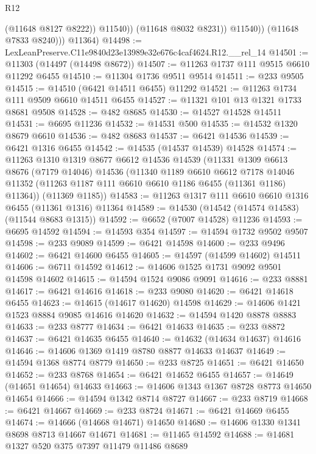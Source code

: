 \begin{lexlean}{R12}
\begin{coremodule}
                      (@11648 @8127 @8222))
                    @11540))
                (@11648 @8032 @8231))
              @11540))
          (@11648 @7833 @8240)))
      @11364)
@14498 := LexLeanPreserve.C11e9840d23e13989e32e676c4caf4624.R12.__rel_14
@14501 := @11303 (@14497 (@14498 @8672))
@14507 := @11263 @1737 @111 @9515 @6610 @11292 @6455
@14510 := @11304 @1736 @9511 @9514
@14511 := @233 @9505
@14515 := @14510 (@6421 @14511 @6455) @11292
@14521 := @11263 @1734 @111 @9509 @6610 @14511 @6455
@14527 := @11321 @101 @13 @1321 @1733 @8681 @9508
@14528 := @482 @8685
@14530 := @14527 @14528 @14511
@14531 := @6695 @11236
@14532 := @14531 @500
@14535 := @14532 @1320 @8679 @6610
@14536 := @482 @8683
@14537 := @6421 @14536
@14539 := @6421 @1316 @6455
@14542 := @14535 (@14537 @14539) @14528
@14574 := @11263
    @1310
    @1319
    @8677
    @6612
    @14536
    @14539
    (@11331
      @1309
      @6613
      @8676
      (@7179 @14046)
      @14536
      (@11340
        @1189
        @6610
        @6612
        @7178
        @14046
        @11352
        (@11263 @1187 @111 @6610 @6610 @1186 @6455 (@11361 @1186) @11364))
      (@11369 @1185))
@14583 := @11263 @1317 @111 @6610 @6610 @1316 @6455 (@11361 @1316) @11364
@14589 := @14530 (@14542 (@14574 @14583) (@11544 @8683 @1315))
@14592 := @6652 (@7007 @14528) @11236
@14593 := @6695 @14592
@14594 := @14593 @354
@14597 := @14594 @1732 @9502 @9507
@14598 := @233 @9089
@14599 := @6421 @14598
@14600 := @233 @9496
@14602 := @6421 @14600 @6455
@14605 := @14597 (@14599 @14602) @14511
@14606 := @6711 @14592
@14612 := @14606 @1525 @1731 @9092 @9501 @14598 @14602
@14615 := @14594 @1524 @9086 @9091
@14616 := @233 @8881
@14617 := @6421 @14616
@14618 := @233 @9080
@14620 := @6421 @14618 @6455
@14623 := @14615 (@14617 @14620) @14598
@14629 := @14606 @1421 @1523 @8884 @9085 @14616 @14620
@14632 := @14594 @1420 @8878 @8883
@14633 := @233 @8777
@14634 := @6421 @14633
@14635 := @233 @8872
@14637 := @6421 @14635 @6455
@14640 := @14632 (@14634 @14637) @14616
@14646 := @14606 @1369 @1419 @8780 @8877 @14633 @14637
@14649 := @14594 @1368 @8774 @8779
@14650 := @233 @8725
@14651 := @6421 @14650
@14652 := @233 @8768
@14654 := @6421 @14652 @6455
@14657 := @14649 (@14651 @14654) @14633
@14663 := @14606 @1343 @1367 @8728 @8773 @14650 @14654
@14666 := @14594 @1342 @8714 @8727
@14667 := @233 @8719
@14668 := @6421 @14667
@14669 := @233 @8724
@14671 := @6421 @14669 @6455
@14674 := @14666 (@14668 @14671) @14650
@14680 := @14606 @1330 @1341 @8698 @8713 @14667 @14671
@14681 := @11465 @14592
@14688 := @14681 @1327 @520 @375 @7397 @11479 @11486 @8689

\end{coremodule}
\end{lexlean}
